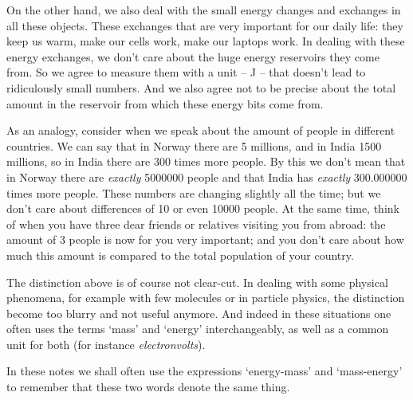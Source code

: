 \documentclass[a4paper,12pt,%
onecolumn,oneside,titlepage,%
british%
]{memoir}
\providecommand{\href}[2]{#2}
\newcommand*{\furl}[2]{\href{#1}{#2}\pagenote{\url{#1}}}
\renewcommand*{\|}[1][]{\nonscript\:#1\vert\nonscript\:\mathopen{}}
\newcommand*{\energym}{energy-mass}
\newcommand*{\masse}{mass-energy}
\begin{document}
On the other hand, we also deal with the small energy changes and exchanges in all these objects. These exchanges that are very important for our daily life: they keep us warm, make our cells work, make our laptops work. In dealing with these energy exchanges, we don't care about the huge energy reservoirs they come from. So we agree to measure them with a unit -- \unit{J} -- that doesn't lead to ridiculously small numbers. And we also agree not to be precise about the total amount in the reservoir from which these energy bits come from.

As an analogy, consider when we speak about the amount of people in different countries. We can say that in Norway there are \num{5} millions, and in India \num{1500} millions, so in India there are \num{300} times more people. By this we don't mean that in Norway there are \emph{exactly} \num{5000000} people and that India has \emph{exactly} \num{300.000000} times more people. These numbers are changing slightly all the time; but we don't care about differences of 10 or even \num{10000} people. At the same time, think of when you have three dear friends or relatives visiting you from abroad: the amount of \num{3} people is now for you very important; and you don't care about how much this amount is compared to the total population of your country.

\smallskip

The distinction above is of course not clear-cut. In dealing with some physical phenomena, for example with few molecules or in particle physics, the distinction become too blurry and not useful anymore. And indeed in these situations one often uses the terms \enquote*{mass} and \enquote*{energy} interchangeably, as well as a common unit for both (for instance \furl{https://home.cern/tags/13-tev}{\emph{electronvolts}}).

\medskip

In these notes we shall often use the expressions \enquote*{\energym} and \enquote*{\masse} to remember that these two words denote the same thing.
\end{document}
